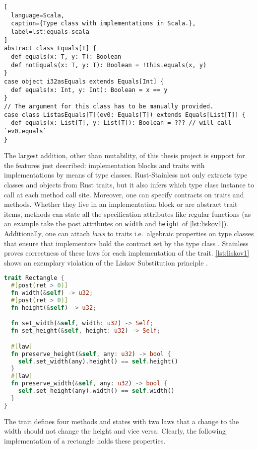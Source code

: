 \begin{lstlisting}[
  language=Scala,
  caption={Type class with implementations in Scala.},
  label=lst:equals-scala
]
abstract class Equals[T] {
  def equals(x: T, y: T): Boolean
  def notEquals(x: T, y: T): Boolean = !this.equals(x, y)
}
case object i32asEquals extends Equals[Int] {
  def equals(x: Int, y: Int): Boolean = x == y
}
// The argument for this class has to be manually provided.
case class ListasEquals[T](ev0: Equals[T]) extends Equals[List[T]] {
  def equals(x: List[T], y: List[T]): Boolean = ??? // will call `ev0.equals`
}
\end{lstlisting}

The largest addition, other than mutability, of this thesis project is
support for the features just described: implementation blocks and
traits with implementations by means of type classes. Rust-Stainless not
only extracts type classes and objects from Rust traits, but it also
infers which type class instance to call at each method call site.
Moreover, one can specify contracts on traits and methods. Whether they
live in an implementation block or are abstract trait items, methods can
state all the specification attributes like regular functions (as an
example take the post attributes on \passthrough{\lstinline!width!} and
\passthrough{\lstinline!height!} of \autoref{lst:liskov1}).
Additionally, one can attach \emph{laws} to traits i.e.~algebraic
properties on type classes that ensure that implementors hold the
contract set by the type class \cite[section "Specifying Algebraic
Properties"]{stainless-doc}. Stainless proves correctness of these laws
for each implementation of the trait. \autoref{lst:liskov1} shows an
exemplary violation of the Liskov Substitution principle \cite{liskov}.

\begin{lstlisting}[language=Rust, caption={Example trait with laws.}, label={lst:liskov1}]
trait Rectangle {
  #[post(ret > 0)]
  fn width(&self) -> u32;
  #[post(ret > 0)]
  fn height(&self) -> u32;

  fn set_width(&self, width: u32) -> Self;
  fn set_height(&self, height: u32) -> Self;

  #[law]
  fn preserve_height(&self, any: u32) -> bool {
    self.set_width(any).height() == self.height()
  }
  #[law]
  fn preserve_width(&self, any: u32) -> bool {
    self.set_height(any).width() == self.width()
  }
}
\end{lstlisting}

The trait defines four methods and states with two laws that a change to
the width should not change the height and vice versa. Clearly, the
following implementation of a rectangle holds these properties.

